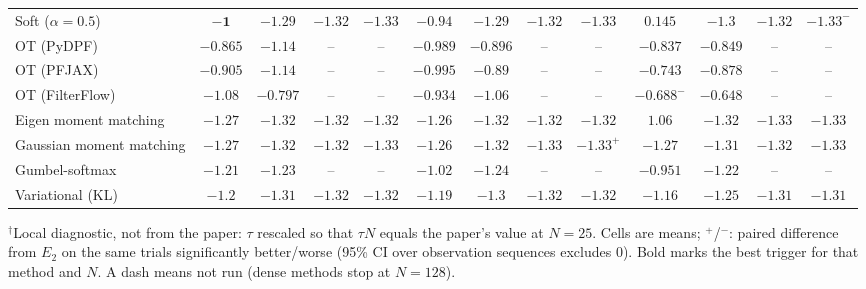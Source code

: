 \begin{table}[ht]
\begin{adjustbox}{max width=\linewidth}
\begin{tabular}{lcccc|cccc|cccc}
Soft ($\alpha{=}0.5$) & $\mathbf{-1}$ & $-1.29$ & $-1.32$ & $\mathbf{-1.33}$ & $-0.94$ & $-1.29$ & $\mathbf{-1.32}$ & $-1.33$ & $0.145$ & $\mathbf{-1.3}$ & $-1.32$ & $-1.33^{-}$ \\
OT (PyDPF) & $-0.865$ & $\mathbf{-1.14}$ & -- & -- & $\mathbf{-0.989}$ & $-0.896$ & -- & -- & $-0.837$ & $-0.849$ & -- & -- \\
OT (PFJAX) & $-0.905$ & $\mathbf{-1.14}$ & -- & -- & $\mathbf{-0.995}$ & $-0.89$ & -- & -- & $-0.743$ & $-0.878$ & -- & -- \\
OT (FilterFlow) & $\mathbf{-1.08}$ & $-0.797$ & -- & -- & $-0.934$ & $\mathbf{-1.06}$ & -- & -- & $-0.688^{-}$ & $-0.648$ & -- & -- \\
Eigen moment matching & $\mathbf{-1.27}$ & $-1.32$ & $-1.32$ & $-1.32$ & $-1.26$ & $-1.32$ & $-1.32$ & $-1.32$ & $1.06$ & $\mathbf{-1.32}$ & $\mathbf{-1.33}$ & $\mathbf{-1.33}$ \\
Gaussian moment matching & $-1.27$ & $-1.32$ & $-1.32$ & $-1.33$ & $-1.26$ & $\mathbf{-1.32}$ & $\mathbf{-1.33}$ & $-1.33^{+}$ & $\mathbf{-1.27}$ & $-1.31$ & $-1.32$ & $\mathbf{-1.33}$ \\
Gumbel-softmax & $\mathbf{-1.21}$ & $-1.23$ & -- & -- & $-1.02$ & $\mathbf{-1.24}$ & -- & -- & $-0.951$ & $-1.22$ & -- & -- \\
Variational (KL) & $\mathbf{-1.2}$ & $\mathbf{-1.31}$ & $-1.32$ & $\mathbf{-1.32}$ & $-1.19$ & $-1.3$ & $\mathbf{-1.32}$ & $-1.32$ & $-1.16$ & $-1.25$ & $-1.31$ & $-1.31$ \\
\bottomrule
\end{tabular}
\end{adjustbox}
\par\smallskip\parbox{0.95\linewidth}{\footnotesize $^\dagger$Local diagnostic, not from the paper: $\tau$ rescaled so that $\tau N$ equals the paper's value at $N{=}25$. Cells are means; $^{+}$/$^{-}$: paired difference from $E_2$ on the same trials significantly better/worse (95\% CI over observation sequences excludes 0). Bold marks the best trigger for that method and $N$. A dash means not run (dense methods stop at $N{=}128$).}
\end{table}

